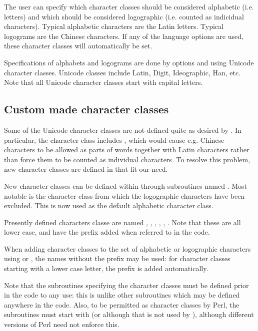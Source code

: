 \documentclass{article}
\begin{document}
The user can specify which character classes should be considered alphabetic (i.e. letters) and which should be considered logographic (i.e. counted as indicidual characters). Typical alphabetic characters are the Latin letters. Typical logograms are the Chinese characters. If any of the language options are used, these character classes will automatically be set.

Specifications of alphabets and logograms are done by options  and  using Unicode character classes. Unicode classes include Latin, Digit, Ideographic, Han, etc. Note that all Unicode character classes start with capital letters. 


\subsection{Custom made character classes}

Some of the Unicode character classes are not defined quite as desired by \TeXcount{}. In particular, the  character class includes , which would cause e.g. Chinese characters to be allowed as parts of words together with Latin characters rather than force them to be counted as individual characters. To resolve this problem, new character classes are defined in \TeXcount{} that fit our need.

New character classes can be defined within \TeXcount{} through subroutines named . Most notable is the  character class from which the logographic characters have been excluded. This is now used as the default alphabetic character class.

Presently defined characters classe are named , , , , , . Note that these are all lower case, and have the prefix  added when referred to in the code.

When adding character classes to the set of alphabetic or logographic characters using  or , the names without the prefix  may be used: for character classes starting with a lower case letter, the prefix is added automatically.

Note that the subroutines specifying the character classes must be defined prior in the code to any use: this is unlike other subroutines which may be defined anywhere in the code. Also, to be permitted as character classes by Perl, the subroutines must start with  (or  although that is not used by \TeXcount{}), although different versions of Perl need not enforce this.
\end{document}
